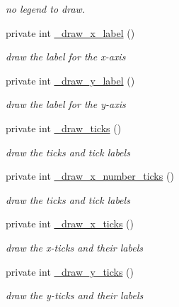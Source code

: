 \begin{DoxyCompactItemize}
\begin{DoxyCompactList}\small\item\em no legend to draw. \item\end{DoxyCompactList}\item 
private int \hyperlink{classChart_1_1Base_a5ad71ca4e51c7d4876561737f048a6e7}{\_\-draw\_\-x\_\-label} ()
\begin{DoxyCompactList}\small\item\em draw the label for the x-\/axis \item\end{DoxyCompactList}\item 
private int \hyperlink{classChart_1_1Base_a6aafcea3c04d6a030a29892f04b25c1f}{\_\-draw\_\-y\_\-label} ()
\begin{DoxyCompactList}\small\item\em draw the label for the y-\/axis \item\end{DoxyCompactList}\item 
private int \hyperlink{classChart_1_1Base_a26f0a0f81ae5e6082c2e7f7c00981dac}{\_\-draw\_\-ticks} ()
\begin{DoxyCompactList}\small\item\em draw the ticks and tick labels \item\end{DoxyCompactList}\item 
private int \hyperlink{classChart_1_1Base_a4f10e76a428b6b09c7ac17a8d8212701}{\_\-draw\_\-x\_\-number\_\-ticks} ()
\begin{DoxyCompactList}\small\item\em draw the ticks and tick labels \item\end{DoxyCompactList}\item 
private int \hyperlink{classChart_1_1Base_a64a81b266a528e24e5547ac504c1fc78}{\_\-draw\_\-x\_\-ticks} ()
\begin{DoxyCompactList}\small\item\em draw the x-\/ticks and their labels \item\end{DoxyCompactList}\item 
private int \hyperlink{classChart_1_1Base_a46852297ab12aaf10546e63dd7eab462}{\_\-draw\_\-y\_\-ticks} ()
\begin{DoxyCompactList}\small\item\em draw the y-\/ticks and their labels \item\end{DoxyCompactList}\item 

\end{DoxyCompactItemize}

